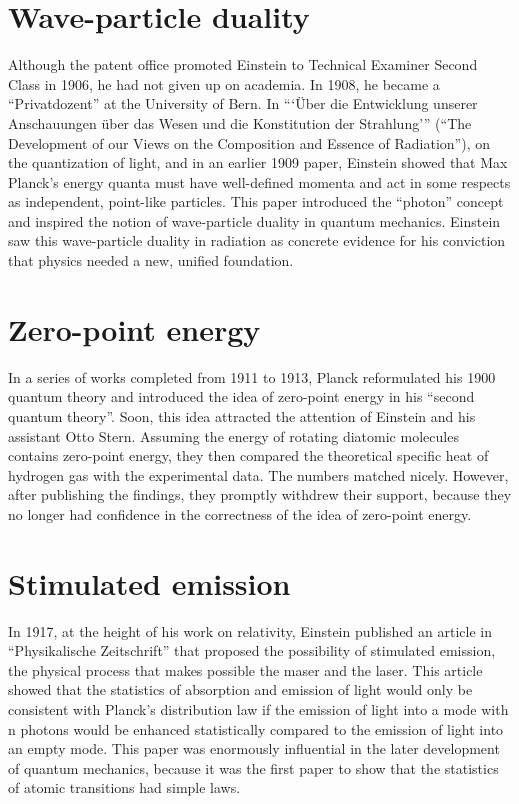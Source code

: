\documentclass[twoside]{memoir}
\begin{document}
\section{Wave-particle duality}\label{wave-particle-duality}

Although the patent office promoted Einstein to Technical Examiner Second Class in 1906, he had not given up on academia. In 1908, he became a \enquote{Privatdozent} at the University of Bern.  In \enquote{\enquote{Über die Entwicklung unserer Anschauungen über das Wesen und die Konstitution der Strahlung}} (\enquote{The Development of our Views on the Composition and Essence of Radiation}), on the quantization of light, and in an earlier 1909 paper, Einstein showed that Max Planck's energy quanta must have well-defined momenta and act in some respects as independent, point-like particles. This paper introduced the \enquote{photon} concept and inspired the notion of wave-particle duality in quantum mechanics. Einstein saw this wave-particle duality in radiation as concrete evidence for his conviction that physics needed a new, unified foundation.

\section{Zero-point energy}\label{zero-point-energy}

In a series of works completed from 1911 to 1913, Planck reformulated his 1900 quantum theory and introduced the idea of zero-point energy in his \enquote{second quantum theory}. Soon, this idea attracted the attention of Einstein and his assistant Otto Stern. Assuming the energy of rotating diatomic molecules contains zero-point energy, they then compared the theoretical specific heat of hydrogen gas with the experimental data. The numbers matched nicely. However, after publishing the findings, they promptly withdrew their support, because they no longer had confidence in the correctness of the idea of zero-point energy.

\section{Stimulated emission}\label{stimulated-emission}

In 1917, at the height of his work on relativity, Einstein published an article in \enquote{Physikalische Zeitschrift}  that proposed the possibility of stimulated emission, the physical process that makes possible the maser and the laser.
This article showed that the statistics of absorption and emission of light would only be consistent with Planck's distribution law if the emission of light into a mode with n photons would be enhanced statistically compared to the emission of light into an empty mode. This paper was enormously influential in the later development of quantum mechanics, because it was the first paper to show that the statistics of atomic transitions had simple laws.
\end{document}
